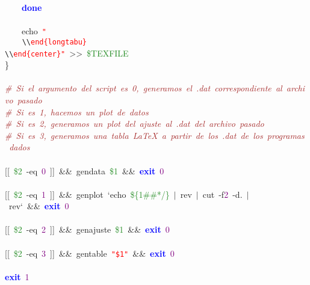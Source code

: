\mbox{}\ \ \ \ \textbf{\textcolor{Blue}{done}} \\
\mbox{} \\
\mbox{}\ \ \ \ echo\ \texttt{\textcolor{Red}{"{}}} \\
\mbox{}\texttt{\textcolor{Red}{\ \ \ \ }}\texttt{\textcolor{CarnationPink}{\textbackslash{}\textbackslash{}}}\texttt{\textcolor{Red}{end\{longtabu\}}} \\
\mbox{}\texttt{\textcolor{CarnationPink}{\textbackslash{}\textbackslash{}}}\texttt{\textcolor{Red}{end\{center\}"{}}}\ \textcolor{BrickRed}{\textgreater{}\textgreater{}}\ \textcolor{ForestGreen}{\$TEXFILE} \\
\mbox{}\} \\
\mbox{} \\
\mbox{}\textit{\textcolor{Brown}{\#\ Si\ el\ argumento\ del\ script\ es\ 0,\ generamos\ el\ .dat\ correspondiente\ al\ archivo\ pasado}} \\
\mbox{}\textit{\textcolor{Brown}{\#\ Si\ es\ 1,\ hacemos\ un\ plot\ de\ datos}} \\
\mbox{}\textit{\textcolor{Brown}{\#\ Si\ es\ 2,\ generamos\ un\ plot\ del\ ajuste\ al\ .dat\ del\ archivo\ pasado}} \\
\mbox{}\textit{\textcolor{Brown}{\#\ Si\ es\ 3,\ generamos\ una\ tabla\ LaTeX\ a\ partir\ de\ los\ .dat\ de\ los\ programas\ dados}} \\
\mbox{} \\
\mbox{}\textcolor{BrickRed}{[[}\ \textcolor{ForestGreen}{\$2}\ -eq\ \textcolor{Purple}{0}\ \textcolor{BrickRed}{]]}\ \textcolor{BrickRed}{\&\&}\ gendata\ \textcolor{ForestGreen}{\$1}\ \textcolor{BrickRed}{\&\&}\ \textbf{\textcolor{Blue}{exit}}\ \textcolor{Purple}{0} \\
\mbox{} \\
\mbox{}\textcolor{BrickRed}{[[}\ \textcolor{ForestGreen}{\$2}\ -eq\ \textcolor{Purple}{1}\ \textcolor{BrickRed}{]]}\ \textcolor{BrickRed}{\&\&}\ genplot\ `echo\ \textcolor{ForestGreen}{\$\{1\#\#*/\}}\ \textcolor{BrickRed}{$|$}\ rev\ \textcolor{BrickRed}{$|$}\ cut\ -f\textcolor{Purple}{2}\ -d\textcolor{BrickRed}{.}\ \textcolor{BrickRed}{$|$}\ rev`\ \textcolor{BrickRed}{\&\&}\ \textbf{\textcolor{Blue}{exit}}\ \textcolor{Purple}{0} \\
\mbox{} \\
\mbox{}\textcolor{BrickRed}{[[}\ \textcolor{ForestGreen}{\$2}\ -eq\ \textcolor{Purple}{2}\ \textcolor{BrickRed}{]]}\ \textcolor{BrickRed}{\&\&}\ genajuste\ \textcolor{ForestGreen}{\$1}\ \textcolor{BrickRed}{\&\&}\ \textbf{\textcolor{Blue}{exit}}\ \textcolor{Purple}{0} \\
\mbox{} \\
\mbox{}\textcolor{BrickRed}{[[}\ \textcolor{ForestGreen}{\$2}\ -eq\ \textcolor{Purple}{3}\ \textcolor{BrickRed}{]]}\ \textcolor{BrickRed}{\&\&}\ gentable\ \texttt{\textcolor{Red}{"{}\$1"{}}}\ \textcolor{BrickRed}{\&\&}\ \textbf{\textcolor{Blue}{exit}}\ \textcolor{Purple}{0} \\
\mbox{} \\
\mbox{}\textbf{\textcolor{Blue}{exit}}\ \textcolor{Purple}{1} \\
\mbox{}
